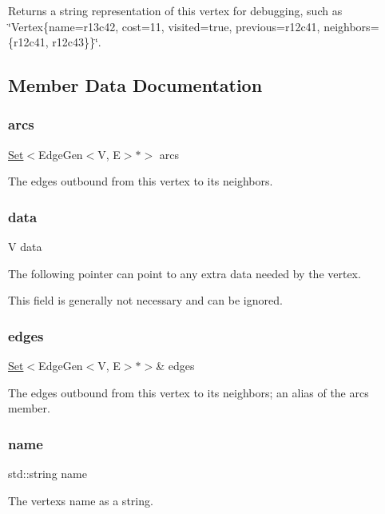Returns a string representation of this vertex for debugging, such as \char`\"{}\+Vertex\{name=r13c42, cost=11, visited=true, previous=r12c41, neighbors=\{r12c41, r12c43\}\}\char`\"{}. 



\subsection{Member Data Documentation}
\mbox{\label{classVertexGen_aa0cee1fcace4fca3db468e83aa4672fe}} 
\subsubsection{\texorpdfstring{arcs}{arcs}}
{\footnotesize\ttfamily \mbox{\hyperlink{classSet}{Set}}$<$Edge\+Gen$<$V, E$>$$\ast$$>$ arcs}



The edges outbound from this vertex to its neighbors. 

\mbox{\label{classVertexGen_a0cff2e152738a487e0930e21b7824c40}} 
\subsubsection{\texorpdfstring{data}{data}}
{\footnotesize\ttfamily V data}



The following pointer can point to any extra data needed by the vertex. 

This field is generally not necessary and can be ignored. \mbox{\label{classVertexGen_a795e7fd80b24c26fdd9fa879db40a403}} 
\subsubsection{\texorpdfstring{edges}{edges}}
{\footnotesize\ttfamily \mbox{\hyperlink{classSet}{Set}}$<$Edge\+Gen$<$V, E$>$$\ast$$>$\& edges}



The edges outbound from this vertex to its neighbors; an alias of the \textquotesingle{}arcs\textquotesingle{} member. 

\mbox{\label{classVertexGen_a9b45b3e13bd9167aab02e17e08916231}} 
\subsubsection{\texorpdfstring{name}{name}}
{\footnotesize\ttfamily std\+::string name}



The vertex\textquotesingle{}s name as a string. 

